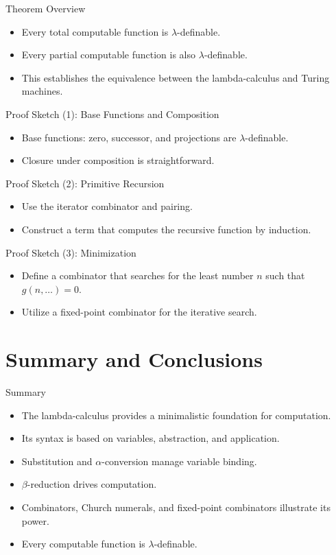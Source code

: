 \documentclass{beamer}
\begin{document}
\begin{frame}{Theorem Overview}
  \begin{itemize}
    \item Every total computable function is \(\lambda\)-definable.
    \item Every partial computable function is also \(\lambda\)-definable.
    \item This establishes the equivalence between the lambda-calculus and Turing machines.
  \end{itemize}
\end{frame}

\begin{frame}{Proof Sketch (1): Base Functions and Composition}
  \begin{itemize}
    \item Base functions: zero, successor, and projections are \(\lambda\)-definable.
    \item Closure under composition is straightforward.
  \end{itemize}
\end{frame}

\begin{frame}{Proof Sketch (2): Primitive Recursion}
  \begin{itemize}
    \item Use the iterator combinator and pairing.
    \item Construct a term that computes the recursive function by induction.
  \end{itemize}
\end{frame}

\begin{frame}{Proof Sketch (3): Minimization}
  \begin{itemize}
    \item Define a combinator that searches for the least number \(n\) such that \(g(n,\dots)=0\).
    \item Utilize a fixed-point combinator for the iterative search.
  \end{itemize}
\end{frame}

\section{Summary and Conclusions}
\begin{frame}{Summary}
  \begin{itemize}
    \item The lambda-calculus provides a minimalistic foundation for computation.
    \item Its syntax is based on variables, abstraction, and application.
    \item Substitution and $\alpha$-conversion manage variable binding.
    \item $\beta$-reduction drives computation.
    \item Combinators, Church numerals, and fixed-point combinators illustrate its power.
    \item Every computable function is $\lambda$-definable.
  \end{itemize}
\end{frame}
\end{document}
